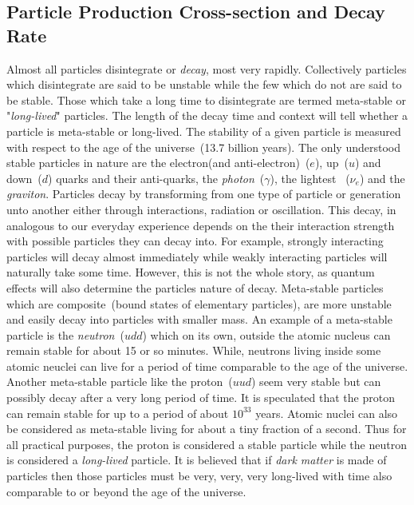 {\subsection{Particle Production Cross-section and Decay Rate}
Almost all particles disintegrate or \textit{decay}, most very rapidly. Collectively particles which disintegrate are said to be unstable while the few which do not are said to be stable. Those which take a long time to disintegrate are termed meta-stable or "\textit{long-lived}" particles. The length of the decay time and context will tell whether a particle is meta-stable or long-lived. The stability of a given particle is measured with respect to the age of the universe~(13.7 billion years). The only understood stable particles in nature are the \textsf{electron}(and \textsf{anti-electron})~($e$), \textsf{up}~($u$) and \textsf{down}~($d$) quarks and their anti-quarks, the \textit{photon}~($\gamma$), the lightest ~($\nu_{e}$) and the \textit{graviton}. 
Particles decay by transforming from one type of particle or generation unto another either through interactions, radiation or oscillation.  This decay, in analogous to our everyday experience depends on the their interaction strength with possible particles they can decay into. For example, strongly interacting particles will decay almost immediately while weakly interacting particles will naturally take some time. However, this is not the whole story, as quantum effects will also determine the particles nature of decay.
Meta-stable particles which are composite~(bound states of elementary particles), are more unstable and easily decay into particles with smaller mass. An example of a meta-stable particle is the \textit{neutron}~(\textsf{$udd$}) which on its own, outside the atomic nucleus can remain stable for about 15 or so minutes. While, neutrons living inside some atomic neuclei can live for a period of time comparable to the age of the universe. Another meta-stable particle like the proton~(\textsf{$uud$}) seem very stable but can possibly decay after a very long period of time. It is speculated that the proton can remain stable for up to a period of about $10^{33}$ years. Atomic nuclei can also be considered as meta-stable living for about a tiny fraction of a second. Thus for all practical purposes, the proton is considered a stable particle while the neutron is considered a \textit{long-lived} particle.  It is believed that if \textit{dark matter} is made of particles then those particles  must be very, very, very long-lived with time also comparable  to or beyond  the age of the universe.

}

